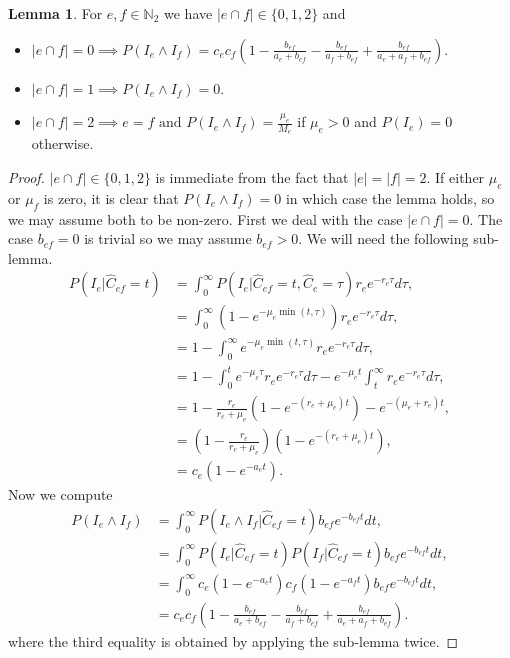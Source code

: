 \documentclass[12pt]{article}
\theoremstyle{definition}
\newtheorem{lemma}[proposition]{Lemma}
\begin{document}
\begin{lemma}\label{expl prob} For $e,f \in \mathbb{N}_2$ we have $|e \cap f| \in \{0,1,2\}$ and
\begin{itemize} 
    \item $|e \cap f| = 0 \implies P(I_e \wedge I_f) = c_ec_f\left(1-\frac{b_{ef}}{a_e+b_{ef}}-\frac{b_{ef}}{a_f+b_{ef}}+\frac{b_{ef}}{a_e+a_f+b_{ef}}\right)$.
    \item $|e \cap f| = 1 \implies P(I_e \wedge I_f) = 0$.
    \item $|e \cap f| = 2 \implies e = f \text{ and } P(I_e \wedge I_f)=\frac{\mu_e}{M_e}$ if $\mu_e > 0$ and $P(I_e)=0$ otherwise.
\end{itemize}
\end{lemma} \begin{proof} $|e \cap f| \in \{0,1,2\}$ is immediate from the fact that $|e|=|f|=2$. If either $\mu_e$ or $\mu_f$ is zero, it is clear that $P(I_e \wedge I_f) = 0$ in which case the lemma holds, so we may assume both to be non-zero. First we deal with the case $|e \cap f| = 0$. The case $b_{ef} =0$ is trivial so we may assume $b_{ef} > 0$. We will need the following sub-lemma.
\begin{align*}
P(I_e|\hat{C}_{ef}=t) &= \int_0^\infty P(I_e|\hat{C}_{ef}=t,\hat{C}_e = \tau)r_ee^{-r_e \tau}d\tau, \\
&= \int_0^\infty (1-e^{-\mu_e\min(t,\tau)}) r_ee^{-r_e \tau}d\tau, \\
&= 1-\int_0^\infty e^{-\mu_e\min(t,\tau)} r_ee^{-r_e \tau}d\tau, \\
&= 1-\int_0^te^{-\mu_e \tau} r_e e^{-r_e \tau}d\tau-e^{-\mu_e t}\int_t^\infty r_ee^{-r_e \tau}d\tau,\\
&= 1-\frac{r_e}{r_e+\mu_e}\left(1-e^{-(r_e+\mu_e)t}\right)-e^{-(\mu_e+r_e)t},\\
&= \left(1-\frac{r_e}{r_e+\mu_e}\right)\left(1-e^{-(r_e+\mu_e)t}\right), \\
&= c_e(1-e^{-a_e t}).
\end{align*}
Now we compute
    \begin{align*}
        P(I_e \wedge I_f) &= \int_0^\infty P(I_e \wedge I_f|\hat{C}_{ef}=t)b_{ef}e^{-b_{ef}t}dt, \\
        &=  \int_0^\infty P(I_e|\hat{C}_{ef}=t)P(I_f|\hat{C}_{ef}=t)b_{ef}e^{-b_{ef}t}dt, \\
        &=  \int_0^\infty c_e(1-e^{-a_e t})c_f(1-e^{-a_f t})b_{ef}e^{-b_{ef}t}dt, \\
        &= c_ec_f\left(1-\frac{b_{ef}}{a_e+b_{ef}}-\frac{b_{ef}}{a_f+b_{ef}}+\frac{b_{ef}}{a_e+a_f+b_{ef}}\right).
    \end{align*} where the third equality is obtained by applying the sub-lemma twice.
    

\end{proof}
\end{document}
